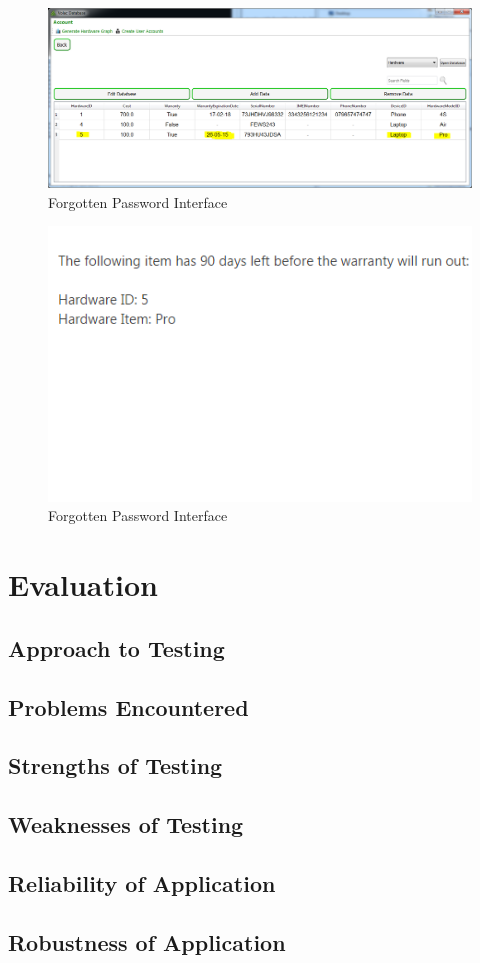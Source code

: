 \begin{figure}[H]
    \includegraphics[width=\textwidth]{./Testing/Images/HardwareDate.png}
    \caption{Forgotten Password Interface} \label{fig:HardwareDate}
\end{figure}

\begin{figure}[H]
    \includegraphics[width=\textwidth]{./Testing/Images/EmailExpiredHardware.png}
    \caption{Forgotten Password Interface} \label{fig:EmailExpiredHardware}
\end{figure}




\section{Evaluation}

\subsection{Approach to Testing}

\subsection{Problems Encountered}

\subsection{Strengths of Testing}

\subsection{Weaknesses of Testing}

\subsection{Reliability of Application}

\subsection{Robustness of Application}